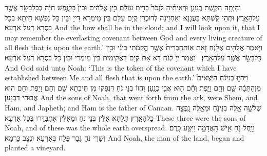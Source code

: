 {וְהָיְתָ֥ה הַקֶּ֖שֶׁת בֶּֽעָנָ֑ן וּרְאִיתִ֗יהָ לִזְכֹּר֙ בְּרִ֣ית עוֹלָ֔ם בֵּ֣ין אֱלֹהִ֔ים וּבֵין֙ כׇּל\maqqaf נֶ֣פֶשׁ חַיָּ֔ה בְּכׇל\maqqaf בָּשָׂ֖ר אֲשֶׁ֥ר עַל\maqqaf הָאָֽרֶץ׃}
{וּתְהֵי קַשְׁתָּא בַּעֲנָנָא וְאַחְזֵינַהּ לְדוּכְרַן קְיָם עָלַם בֵּין מֵימְרָא דַּייָ וּבֵין כָּל נַפְשָׁא חַיְתָא בְּכָל בִּסְרָא דְּעַל אַרְעָא׃}
{And the bow shall be in the cloud; and I will look upon it, that I may remember the everlasting covenant between God and every living creature of all flesh that is upon the earth.’}{}
{וַיֹּ֥אמֶר אֱלֹהִ֖ים אֶל\maqqaf נֹ֑חַ זֹ֤את אֽוֹת\maqqaf הַבְּרִית֙ אֲשֶׁ֣ר הֲקִמֹ֔תִי בֵּינִ֕י וּבֵ֥ין כׇּל\maqqaf בָּשָׂ֖ר אֲשֶׁ֥ר עַל\maqqaf הָאָֽרֶץ׃ \petucha }
{וַאֲמַר יְיָ לְנֹחַ דָּא אָת קְיָם דַּאֲקֵימִית בֵּין מֵימְרִי וּבֵין כָּל בִּסְרָא דְּעַל אַרְעָא׃}
{And God said unto Noah: ‘This is the token of the covenant which I have established between Me and all flesh that is upon the earth.’}{}
\newseder
{}%
{וַיִּֽהְי֣וּ בְנֵי\maqqaf נֹ֗חַ הַיֹּֽצְאִים֙ מִן\maqqaf הַתֵּבָ֔ה שֵׁ֖ם וְחָ֣ם וָיָ֑פֶת וְחָ֕ם ה֖וּא אֲבִ֥י כְנָֽעַן׃}
{וַהֲווֹ בְּנֵי נֹחַ דִּנְפַקוּ מִן תֵּיבְתָא שֵׁם וְחָם וָיָפֶת וְחָם הוּא אֲבוּהִי דִּכְנָעַן׃}
{And the sons of Noah, that went forth from the ark, were Shem, and Ham, and Japheth; and Ham is the father of Canaan.}{}
{שְׁלֹשָׁ֥ה אֵ֖לֶּה בְּנֵי\maqqaf נֹ֑חַ וּמֵאֵ֖לֶּה נָֽפְצָ֥ה כׇל\maqqaf הָאָֽרֶץ׃}
{תְּלָתָא אִלֵּין בְּנֵי נֹחַ וּמֵאִלֵּין אִתְבַּדַּרוּ בְּכָל אַרְעָא׃}
{These three were the sons of Noah, and of these was the whole earth overspread.}{}
{וַיָּ֥חֶל נֹ֖חַ אִ֣ישׁ הָֽאֲדָמָ֑ה וַיִּטַּ֖ע כָּֽרֶם׃}
{וְשָׁרִי נֹחַ גְּבַר פָּלַח בְּאַרְעָא וּנְצַב כַּרְמָא׃}
{And Noah, the man of the land, began and planted a vineyard.}{}
